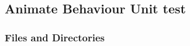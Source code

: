 \documentclass{CSSRforAfrica}
\begin{document}
  
%  


 \subsection{Animate Behaviour Unit test} 
\label{subsection:animate_behaviour_test}

\subsubsection{Files and Directories}
\label{subsubsection:animate_behaviour_test_files}
 
\end{document}
